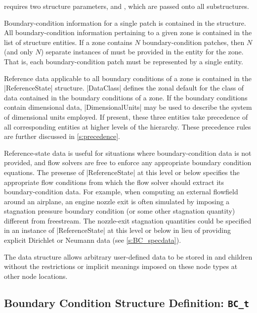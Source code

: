  requires two structure parameters,
 and , which are passed
onto all  substructures.

Boundary-condition information for a single patch is contained in the
 structure.
All boundary-condition information pertaining to a given zone is
contained in the list of  structure entities.
If a zone contains $N$ boundary-condition patches, then $N$ (and
only $N$) separate instances of  must be provided in the
 entity for the zone.
That is, each boundary-condition patch must be represented by a single
 entity.

Reference data applicable to all boundary conditions of a zone is
contained in the |ReferenceState| structure.  |DataClass| defines the
zonal default for the class of data contained in the boundary conditions
of a zone.  If the boundary conditions contain dimensional data,
|DimensionalUnits| may be used to describe the system of dimensional
units employed.  If present, these three entities take precedence of
all corresponding entities at higher levels of the hierarchy.  These
precedence rules are further discussed in \autoref{s:precedence}.

Reference-state data is useful for situations where boundary-condition
data is not provided, and flow solvers are free to enforce any
appropriate boundary condition equations.  The presense of
|ReferenceState| at this level or below specifies the appropriate
flow conditions from which the flow solver should extract its
boundary-condition data.
For example, when computing an external flowfield around an airplane, an
engine nozzle exit is often simulated by imposing a stagnation pressure
boundary condition (or some other stagnation quantity) different from
freestream.
The nozzle-exit
stagnation quantities could be specified in an instance of
|ReferenceState| at this level or below in lieu of providing explicit
Dirichlet or Neumann data (see \autoref{s:BC_specdata}).

The  data structure allows arbitrary
user-defined data to be stored in  and
 children without the restrictions or implicit
meanings imposed on these node types at other node locations.

\subsection{Boundary Condition Structure Definition: \texttt{BC\_t}}
\label{s:BCdefn}

